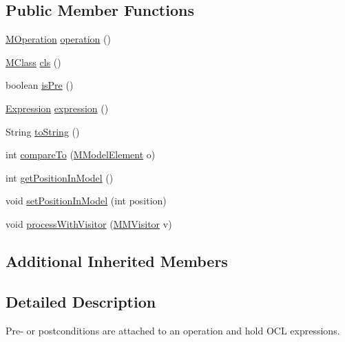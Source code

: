 \subsection*{Public Member Functions}
\begin{DoxyCompactItemize}
\item 
\hyperlink{classorg_1_1tzi_1_1use_1_1uml_1_1mm_1_1_m_operation}{M\-Operation} \hyperlink{classorg_1_1tzi_1_1use_1_1uml_1_1mm_1_1_m_pre_post_condition_ae2b8da173d81c9cd74ee34126d8bc610}{operation} ()
\item 
\hyperlink{interfaceorg_1_1tzi_1_1use_1_1uml_1_1mm_1_1_m_class}{M\-Class} \hyperlink{classorg_1_1tzi_1_1use_1_1uml_1_1mm_1_1_m_pre_post_condition_a0558fcc933f603fc3383f65aba6402e0}{cls} ()
\item 
boolean \hyperlink{classorg_1_1tzi_1_1use_1_1uml_1_1mm_1_1_m_pre_post_condition_a46103de966bdedebf0654faa327493fc}{is\-Pre} ()
\item 
\hyperlink{classorg_1_1tzi_1_1use_1_1uml_1_1ocl_1_1expr_1_1_expression}{Expression} \hyperlink{classorg_1_1tzi_1_1use_1_1uml_1_1mm_1_1_m_pre_post_condition_abb0c5fb149f76cac57f8384d52826c43}{expression} ()
\item 
String \hyperlink{classorg_1_1tzi_1_1use_1_1uml_1_1mm_1_1_m_pre_post_condition_afa855916132e61be8539496eb99dd579}{to\-String} ()
\item 
int \hyperlink{classorg_1_1tzi_1_1use_1_1uml_1_1mm_1_1_m_pre_post_condition_a77316fb919c4eefe0dc4ad00604e4b70}{compare\-To} (\hyperlink{interfaceorg_1_1tzi_1_1use_1_1uml_1_1mm_1_1_m_model_element}{M\-Model\-Element} o)
\item 
int \hyperlink{classorg_1_1tzi_1_1use_1_1uml_1_1mm_1_1_m_pre_post_condition_ae8e85f78ffb8de162efbc04393aa0712}{get\-Position\-In\-Model} ()
\item 
void \hyperlink{classorg_1_1tzi_1_1use_1_1uml_1_1mm_1_1_m_pre_post_condition_a3834152a50092c4c035bf1e95d39fd34}{set\-Position\-In\-Model} (int position)
\item 
void \hyperlink{classorg_1_1tzi_1_1use_1_1uml_1_1mm_1_1_m_pre_post_condition_a3999f3f1974084094756340f5c1a1f23}{process\-With\-Visitor} (\hyperlink{interfaceorg_1_1tzi_1_1use_1_1uml_1_1mm_1_1_m_m_visitor}{M\-M\-Visitor} v)
\end{DoxyCompactItemize}
\subsection*{Additional Inherited Members}


\subsection{Detailed Description}
Pre-\/ or postconditions are attached to an operation and hold O\-C\-L expressions.

